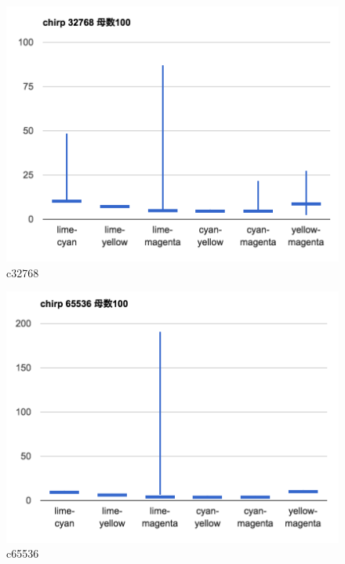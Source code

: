 \begin{figure}[p]
  \centering
  \includegraphics[clip,width=1.05\hsize]{img/c32768.png}
  \caption{c32768}\label{fig:c32768}
\end{figure}

\begin{figure}[p]
  \centering
  \includegraphics[clip,width=1.05\hsize]{img/c65536.png}
  \caption{c65536}\label{fig:c65536}
\end{figure}

